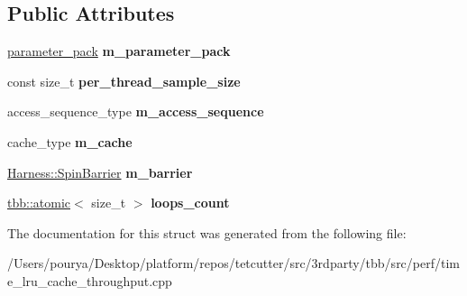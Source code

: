 \subsection*{Public Attributes}
\begin{DoxyCompactItemize}
\item 
\hypertarget{structthroughput_abe04be079a4c424c9a5b0b9280506bf6}{}\hyperlink{structparameter__pack}{parameter\+\_\+pack} {\bfseries m\+\_\+parameter\+\_\+pack}\label{structthroughput_abe04be079a4c424c9a5b0b9280506bf6}

\item 
\hypertarget{structthroughput_a08dcf5c0baa114e0ca383daa882aaf82}{}const size\+\_\+t {\bfseries per\+\_\+thread\+\_\+sample\+\_\+size}\label{structthroughput_a08dcf5c0baa114e0ca383daa882aaf82}

\item 
\hypertarget{structthroughput_ab2662c6a95b299888e474f41e1c7b075}{}access\+\_\+sequence\+\_\+type {\bfseries m\+\_\+access\+\_\+sequence}\label{structthroughput_ab2662c6a95b299888e474f41e1c7b075}

\item 
\hypertarget{structthroughput_ad38f7cfd55f147efe59000d888e9ead0}{}cache\+\_\+type {\bfseries m\+\_\+cache}\label{structthroughput_ad38f7cfd55f147efe59000d888e9ead0}

\item 
\hypertarget{structthroughput_a2bb7cbb35950de5c5b5937aa7d4f9991}{}\hyperlink{classHarness_1_1SpinBarrier}{Harness\+::\+Spin\+Barrier} {\bfseries m\+\_\+barrier}\label{structthroughput_a2bb7cbb35950de5c5b5937aa7d4f9991}

\item 
\hypertarget{structthroughput_a3e461ca5bb7fd9f73227a8bd280bb36a}{}\hyperlink{structtbb_1_1atomic}{tbb\+::atomic}$<$ size\+\_\+t $>$ {\bfseries loops\+\_\+count}\label{structthroughput_a3e461ca5bb7fd9f73227a8bd280bb36a}

\end{DoxyCompactItemize}


The documentation for this struct was generated from the following file\+:\begin{DoxyCompactItemize}
\item 
/\+Users/pourya/\+Desktop/platform/repos/tetcutter/src/3rdparty/tbb/src/perf/time\+\_\+lru\+\_\+cache\+\_\+throughput.\+cpp\end{DoxyCompactItemize}
